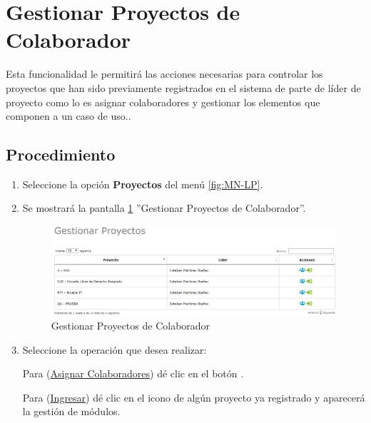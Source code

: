 \hypertarget{cv:GestionarProyectosColaboradores}{\section{Gestionar Proyectos de Colaborador}} \label{sec:GestionarProyectosColaboradores}

	Esta funcionalidad le permitirá las acciones necesarias para controlar los proyectos que han sido previamente registrados en el sistema de parte de líder de proyecto como lo es asignar colaboradores y gestionar los elementos que componen a un caso de uso..

		\subsection{Procedimiento}

			\begin{enumerate}
	
			\item Seleccione la opción \textbf{Proyectos} del menú \ref{fig:MN-LP}.
	
			\item Se mostrará la pantalla \ref{fig:GestionarProyectosColaborador} ''Gestionar Proyectos de Colaborador''.

			\begin{figure}[htbp!]
				\begin{center}
					\includegraphics[scale=0.6]{roles/lider/proyectosColaborador/pantallas/IU4gestionarProyectosColaborador}
					\caption{Gestionar Proyectos de Colaborador}
					\label{fig:GestionarProyectosColaborador}
				\end{center}
			\end{figure}
		
				\item Seleccione la operación que desea realizar:
			
			Para (\hyperlink{cv:elegirColaboradores}{Asignar Colaboradores}) dé clic en el botón \IUAsignar.
			
			Para (\hyperlink{cv:modificarProyecto}{Ingresar}) dé clic en el icono \IUEditar{} de algún proyecto ya registrado y aparecerá la gestión de módulos.
			
			\end{enumerate}